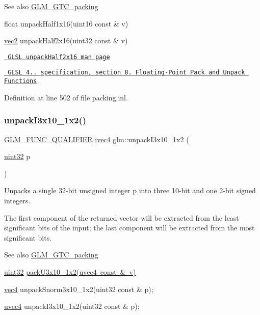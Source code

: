 \begin{DoxySeeAlso}{See also}
\mbox{\hyperlink{group__gtc__packing}{G\+L\+M\+\_\+\+G\+T\+C\+\_\+packing}} 

float unpack\+Half1x16(uint16 const \& v) 

\mbox{\hyperlink{group__core__types_gaa1618f51db67eaa145db101d8c8431d8}{vec2}} unpack\+Half2x16(uint32 const \& v) 

\href{http://www.opengl.org/sdk/docs/manglsl/xhtml/unpackHalf2x16.xml}{\texttt{ G\+L\+SL unpack\+Half2x16 man page}} 

\href{http://www.opengl.org/registry/doc/GLSLangSpec.4.20.8.pdf}{\texttt{ G\+L\+SL 4.. specification, section 8. Floating-\/\+Point Pack and Unpack Functions}} 
\end{DoxySeeAlso}


Definition at line 502 of file packing.\+inl.

\mbox{\label{group__gtc__packing_ga08bcd34cf9c34701d658dd861ee6e300}} 
\subsubsection{\texorpdfstring{unpackI3x10\_1x2()}{unpackI3x10\_1x2()}}
{\footnotesize\ttfamily \mbox{\hyperlink{setup_8hpp_a33fdea6f91c5f834105f7415e2a64407}{G\+L\+M\+\_\+\+F\+U\+N\+C\+\_\+\+Q\+U\+A\+L\+I\+F\+I\+ER}} \mbox{\hyperlink{group__core__types_gaa4560ddc50320ea8f8a70d5c9c249fea}{ivec4}} glm\+::unpack\+I3x10\+\_\+1x2 (\begin{DoxyParamCaption}\item[{\mbox{\hyperlink{group__gtc__type__precision_ga202b6a53c105fcb7e531f9b443518451}{uint32}}}]{p }\end{DoxyParamCaption})}

Unpacks a single 32-\/bit unsigned integer p into three 10-\/bit and one 2-\/bit signed integers.

The first component of the returned vector will be extracted from the least significant bits of the input; the last component will be extracted from the most significant bits.

\begin{DoxySeeAlso}{See also}
\mbox{\hyperlink{group__gtc__packing}{G\+L\+M\+\_\+\+G\+T\+C\+\_\+packing}} 

\mbox{\hyperlink{group__gtc__type__precision_ga202b6a53c105fcb7e531f9b443518451}{uint32}} \mbox{\hyperlink{group__gtc__packing_gaf656d8862628f96b20de7a36eaa1fe56}{pack\+U3x10\+\_\+1x2(uvec4 const \& v)}} 

\mbox{\hyperlink{group__core__types_ga5881b1b022d7fd1b7218f5916532dd02}{vec4}} unpack\+Snorm3x10\+\_\+1x2(uint32 const \& p); 

\mbox{\hyperlink{group__core__types_ga1c426d19627b32b14f0089f7f4ba7b1d}{uvec4}} unpack\+I3x10\+\_\+1x2(uint32 const \& p); 
\end{DoxySeeAlso}


